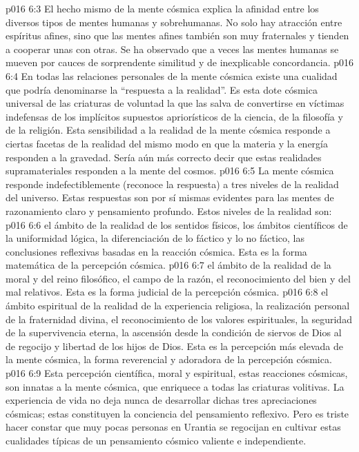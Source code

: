 \vs p016 6:3 El hecho mismo de la mente cósmica explica la afinidad entre los diversos tipos de mentes humanas y sobrehumanas. No solo hay atracción entre espíritus afines, sino que las mentes afines también son muy fraternales y tienden a cooperar unas con otras. Se ha observado que a veces las mentes humanas se mueven por cauces de sorprendente similitud y de inexplicable concordancia.
\vs p016 6:4 \pc En todas las relaciones personales de la mente cósmica existe una cualidad que podría denominarse la “respuesta a la realidad”. Es esta dote cósmica universal de las criaturas de voluntad la que las salva de convertirse en víctimas indefensas de los implícitos supuestos apriorísticos de la ciencia, de la filosofía y de la religión. Esta sensibilidad a la realidad de la mente cósmica responde a ciertas facetas de la realidad del mismo modo en que la materia y la energía responden a la gravedad. Sería aún más correcto decir que estas realidades supramateriales responden a la mente del cosmos.
\vs p016 6:5 La mente cósmica responde indefectiblemente (reconoce la respuesta) a tres niveles de la realidad del universo. Estas respuestas son por sí mismas evidentes para las mentes de razonamiento claro y pensamiento profundo. Estos niveles de la realidad son:
\vs p016 6:6  el ámbito de la realidad de los sentidos físicos, los ámbitos científicos de la uniformidad lógica, la diferenciación de lo fáctico y lo no fáctico, las conclusiones reflexivas basadas en la reacción cósmica. Esta es la forma matemática de la percepción cósmica.
\vs p016 6:7  el ámbito de la realidad de la moral y del reino filosófico, el campo de la razón, el reconocimiento del bien y del mal relativos. Esta es la forma judicial de la percepción cósmica.
\vs p016 6:8  el ámbito espiritual de la realidad de la experiencia religiosa, la realización personal de la fraternidad divina, el reconocimiento de los valores espirituales, la seguridad de la supervivencia eterna, la ascensión desde la condición de siervos de Dios al de regocijo y libertad de los hijos de Dios. Esta es la percepción más elevada de la mente cósmica, la forma reverencial y adoradora de la percepción cósmica.
\vs p016 6:9 \pc Esta percepción científica, moral y espiritual, estas reacciones cósmicas, son innatas a la mente cósmica, que enriquece a todas las criaturas volitivas. La experiencia de vida no deja nunca de desarrollar dichas tres apreciaciones cósmicas; estas constituyen la conciencia del pensamiento reflexivo. Pero es triste hacer constar que muy pocas personas en Urantia se regocijan en cultivar estas cualidades típicas de un pensamiento cósmico valiente e independiente.
